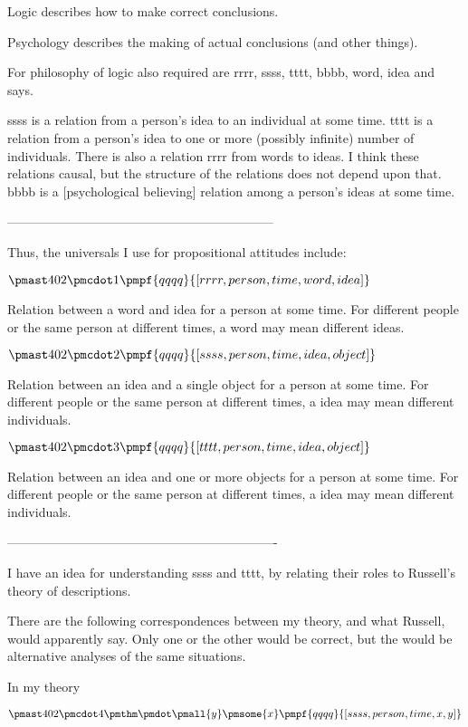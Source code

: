 \documentclass[12pt]{article}
\begin{document}
Logic describes how to make correct conclusions.

Psychology describes the making of actual conclusions (and other things).

For philosophy of logic also required are rrrr, ssss, tttt, bbbb, word, idea and says.

ssss is a relation from a person’s idea to an individual at some time. tttt is a relation from a person’s idea to one or more (possibly infinite) number of individuals. There is also a relation rrrr from words to ideas. I think these relations causal, but the structure of the relations does not depend upon that. bbbb is a [psychological believing] relation among a person’s ideas at some time.

---------------------------------------------------------------

Thus, the universals I use for propositional attitudes include:

$\pmast 402 \pmcdot 1 \pmpf{qqqq}{[rrrr, person, time, word, idea]}$

Relation between a word and idea for a person at some time.
For different people or the same person at different times, a word may mean different ideas.

$\pmast 402 \pmcdot 2 \pmpf{qqqq}{[ssss, person, time, idea, object]}$

Relation between an idea and a single object for a person at some time.
For different people or the same person at different times, a idea may mean different individuals.

$\pmast 402 \pmcdot 3 \pmpf{qqqq}{[tttt, person, time, idea, object]}$

Relation between an idea and one or more objects for a person at some time.
For different people or the same person at different times, a idea may mean different individuals.

----------------------------------------------------------------

I have an idea for understanding ssss and tttt, by relating their roles to Russell's theory of descriptions.

There are the following correspondences between my theory, and what Russell,
would apparently say. Only one or the other would be correct, but the would
be alternative analyses of the same situations.

In my theory

$\pmast 402 \pmcdot 4 \pmthm \pmdot \pmall{y} \pmsome{x} \pmpf{qqqq}{[ssss, person, time, x, y]} $
 
\end{document}
